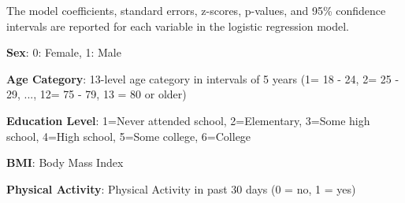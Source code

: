 \documentclass[11pt]{article}
\begin{document}
\begin{codeoutput}
\begin{table}[h]
\caption{Effect modification by BMI on the association between physical activity and diabetes}
\label{table:effect_modification_physical_activity_diabetes}
\begin{threeparttable}
\renewcommand{\TPTminimum}{\linewidth}
\begin{tablenotes}
\footnotesize
\item The model coefficients, standard errors, z-scores, p-values, and 95\% confidence intervals are reported for each variable in the logistic regression model.
\item \textbf{Sex}: 0: Female, 1: Male
\item \textbf{Age Category}: 13-level age category in intervals of 5 years (1= 18 - 24, 2= 25 - 29, ..., 12= 75 - 79, 13 = 80 or older)
\item \textbf{Education Level}: 1=Never attended school, 2=Elementary, 3=Some high school, 4=High school, 5=Some college, 6=College
\item \textbf{BMI}: Body Mass Index
\item \textbf{Physical Activity}: Physical Activity in past 30 days (0 = no, 1 = yes)

\end{tablenotes}
\end{threeparttable}
\end{table}
\end{codeoutput}
\end{document}
